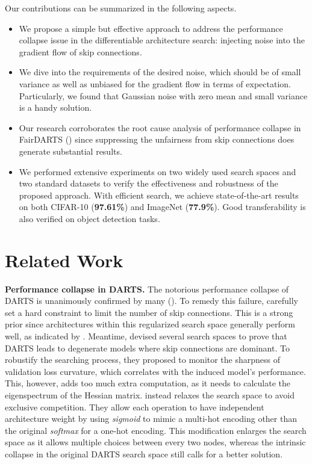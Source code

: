 \documentclass{article}
\newcommand{\citec}[1]{(\cite{#1})}
\begin{document}
Our contributions can be summarized in the following aspects.

\begin{itemize}
	\item We propose a simple but effective approach to address the performance collapse issue in the differentiable architecture search: injecting noise into the gradient flow of skip connections.
	\item We dive into the requirements of the desired noise, which should be of small variance as well as unbiased for the gradient flow in terms of expectation. Particularly, we found that Gaussian noise with zero mean and small variance is a handy solution.
	\item Our research corroborates the root cause analysis of performance collapse in FairDARTS \citec{chu2019fair} since suppressing the unfairness from skip connections does generate substantial results.
	
\item We performed extensive experiments on two widely used search spaces and two standard datasets to verify the effectiveness and robustness of the proposed approach. With efficient search, we achieve state-of-the-art results on both CIFAR-10 (\textbf{97.61\%}) and ImageNet (\textbf{77.9\%}). Good transferability is also verified on object detection tasks. 
\end{itemize}

\section{Related Work}

\textbf{Performance collapse in DARTS.}
The notorious performance collapse of DARTS is unanimously confirmed by many \citec{chen2019progressive,zela2020understanding,chu2019fair}. To remedy this failure, \cite{chen2019progressive} carefully set a hard constraint to limit the number of skip connections. This is a strong prior since architectures within this regularized search space generally perform well, as indicated by \cite{chu2019fair}. Meantime, \cite{zela2020understanding} devised several search spaces to prove that DARTS leads to degenerate models where skip connections are dominant. To robustify the searching process, they proposed to monitor the sharpness of validation loss curvature, which correlates with the induced model's performance. This, however, adds too much extra computation, as it needs to calculate the eigenspectrum of the Hessian matrix. \cite{chu2019fair} instead relaxes the search space to avoid exclusive competition. They allow each operation to have independent architecture weight by using \emph{sigmoid} to mimic a multi-hot encoding other than the original \emph{softmax} for a one-hot encoding. This modification enlarges the search space as it allows multiple choices between every two nodes, whereas the intrinsic collapse in the original DARTS search space still calls for a better solution.
\end{document}
